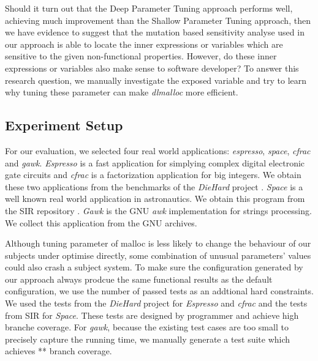 Should it turn out that the Deep Parameter Tuning approach performs well, achieving much improvement than the Shallow Parameter Tuning approach, then we have evidence to suggest that the mutation based sensitivity analyse used in our approach is able to locate the inner expressions or variables which are sensitive to the given non-functional properties. However, do these inner expressions or variables also make sense to software developer? To answer this research question, we manually investigate the exposed variable and try to learn why tuning these parameter can make \emph{dlmalloc} more efficient.  

\subsection{Experiment Setup}


\begin{table}[htbp]
\centering
\caption{Subject applications}
\label{tab_sub_app}
\end{table}

For our evaluation, we selected four real world applications: \emph{espresso}, \emph{space}, \emph{cfrac} and \emph{gawk}. \emph{Espresso} is a fast application for simplying complex digital electronic gate circuits and \emph{cfrac} is a factorization application for big integers. We obtain these two applications from the benchmarks of the \emph{DieHard} project \cite{Berger:2006:DPM:1133255.1134000}. \emph{Space} is a well known real world application in astronautics. We obtain this program from the SIR repository \cite{SIR2005}. \emph{Gawk} is the GNU \emph{awk} implementation for strings processing. We collect this application from the GNU archives.

Although tuning parameter of malloc is less likely to change the behaviour of our subjects under optimise directly, some combination of unusual parameters' values could also crash a subject system. To make sure the configuration generated by our approach always prodcue the same functional results as the default configuration, we use the number of passed tests as an addtional hard constraints. We used the tests from the \emph{DieHard} project for \emph{Espresso} and \emph{cfrac} and the tests from SIR for \emph{Space}. These tests are designed by programmer and achieve high branche coverage. For \emph{gawk}, because the existing test cases are too small to precisely capture the running time, we manually generate a test suite which achieves ** branch coverage.

